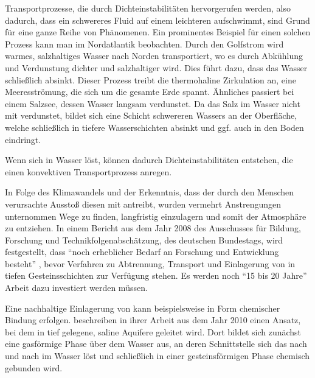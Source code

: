 
\label{cha:intro}


Transportprozesse, die durch Dichteinstabilitäten hervorgerufen werden, also dadurch, dass ein schwereres Fluid auf einem leichteren aufschwimmt, sind Grund für eine ganze Reihe von Phänomenen.
Ein prominentes Beispiel für einen solchen Prozess kann man im Nordatlantik beobachten. Durch den Golfstrom wird warmes, salzhaltiges Wasser nach Norden transportiert, wo es durch Abkühlung und Verdunstung dichter und salzhaltiger wird. Dies führt dazu, dass das Wasser schließlich absinkt. Dieser Prozess treibt die thermohaline Zirkulation an, eine Meeresströmung, die sich um die gesamte Erde spannt. 
Ähnliches passiert bei einem Salzsee, dessen Wasser langsam verdunstet. Da das Salz im Wasser nicht mit verdunstet, bildet sich eine Schicht schwereren Wassers an der Oberfläche, welche schließlich in tiefere Wasserschichten absinkt und ggf. auch in den Boden eindringt.

Wenn sich \COT in Wasser löst, können dadurch Dichteinstabilitäten entstehen, die einen konvektiven Transportprozess anregen.

In Folge des Klimawandels und der Erkenntnis, dass der durch den Menschen verursachte \COTm Ausstoß diesen mit antreibt, wurden vermehrt Anstrengungen unternommen Wege zu finden, \COT langfristig einzulagern und somit der Atmosphäre zu entziehen. 
In einem Bericht aus dem Jahr 2008 des Ausschusses für Bildung, Forschung und Technikfolgenabschätzung, des deutschen Bundestags, wird festgestellt, dass ``noch erheblicher Bedarf an Forschung und Entwicklung besteht'' \citep{taccs}, bevor Verfahren zu Abtrennung, Transport und Einlagerung von \COT in tiefen Gesteinsschichten zur Verfügung stehen. Es werden noch ``15 bis 20 Jahre'' Arbeit dazu investiert werden müssen.

Eine nachhaltige Einlagerung von \COT kann beispielsweise in Form chemischer Bindung erfolgen. \cite{kneafsy} beschreiben in ihrer Arbeit aus dem Jahr 2010 einen Ansatz, bei dem \COT in tief gelegene, saline Aquifere geleitet wird. Dort bildet sich zunächst eine gasförmige Phase über dem Wasser aus, an deren Schnittstelle sich das \COT nach und nach im Wasser löst und schließlich in einer gesteinsförmigen Phase chemisch gebunden wird. 


